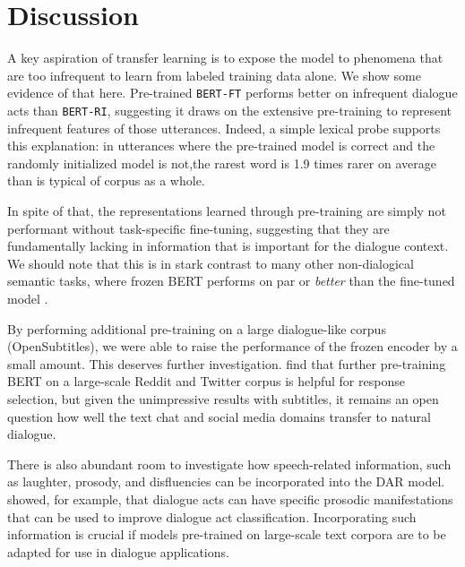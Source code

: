 \documentclass[11pt,a4paper]{article}
\begin{document}
\section{Discussion} 

A key aspiration of transfer learning is to expose the model to 
phenomena that are too infrequent to learn from labeled training data alone.
We show some evidence of that here.
Pre-trained \texttt{BERT-FT} performs better on infrequent dialogue acts than \texttt{BERT-RI}, 
suggesting it draws on the extensive pre-training to represent infrequent features of those utterances.
Indeed, a simple lexical probe supports this explanation: in utterances where the pre-trained model is correct and the randomly initialized model is not,the rarest word is 1.9 times rarer on average than is typical of corpus as a whole.

In spite of that, the representations learned through pre-training are simply not performant without
task-specific fine-tuning, suggesting that they are fundamentally lacking in information that is 
important for the dialogue context.
We should note that this is in stark contrast to many other non-dialogical semantic tasks,
where frozen BERT performs on par or \emph{better} than the fine-tuned model \citep{petersTuneNotTune2019}.

By performing additional pre-training on a large dialogue-like corpus (OpenSubtitles),
we were able to raise the performance of the frozen encoder by a small amount.
This deserves further investigation. 
\citet{baoPLATOPretrainedDialogue2019} find that further pre-training BERT on a large-scale Reddit and Twitter corpus is helpful for response selection, but given the unimpressive results with subtitles, it remains an open question how well the text chat and social media domains transfer to natural dialogue.


There is also abundant room to investigate how speech-related information, such as laughter, prosody, 
and disfluencies can be incorporated into the DAR model.
\citet{stolckeDialogueActModeling2000} showed, for example, that dialogue acts can have specific prosodic manifestations that can be used to improve dialogue act classification.
Incorporating such information is crucial if models pre-trained on large-scale text corpora are to be adapted for use in dialogue applications.
\end{document}
